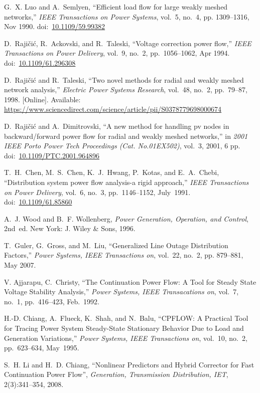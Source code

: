 \documentclass[12pt]{article}
\newcommand{\doi}[1]{doi:~\href{https://doi.org/#1}{#1}}
\numberwithin{equation}{section}
\numberwithin{table}{section}
\numberwithin{figure}{section}
\begin{document}
\begin{thebibliography}{99}
G.~X. Luo and A.~Semlyen, ``Efficient load flow for large weakly meshed
  networks,'' \emph{IEEE Transactions on Power Systems}, vol.~5, no.~4, pp.
  1309--1316, Nov 1990.
  \doi{10.1109/59.99382}

D.~Raji\v{c}i\'{c}, R.~Ackovski, and R.~Taleski, ``Voltage correction power flow,''
  \emph{IEEE Transactions on Power Delivery}, vol.~9, no.~2, pp.~1056--1062,
  Apr 1994.
  \doi{10.1109/61.296308}

D.~Raji\v{c}i\'{c} and R.~Taleski, ``Two novel methods for radial and weakly
  meshed network analysis,'' \emph{Electric Power Systems Research}, vol.~48,
  no.~2, pp.~79--87, 1998. [Online]. Available:
  \url{https://www.sciencedirect.com/science/article/pii/S0378779698000674}

D.~Raji\v{c}i\'{c} and A.~Dimitrovski, ``A new method for handling pv nodes in
backward/forward power flow for radial and weakly meshed networks,'' in
\emph{2001 IEEE Porto Power Tech Proceedings (Cat. No.01EX502)}, vol.~3,
2001, 6 pp.
\doi{10.1109/PTC.2001.964896}

T.~H.~Chen, M.~S.~Chen, K.~J.~Hwang, P.~Kotas, and E.~A.~Chebi, ``Distribution system power flow analysis-a rigid approach,'' \emph{IEEE Transactions on Power Delivery}, vol.~6, no.~3, pp.~1146--1152, July~1991.
\doi{10.1109/61.85860}

A.~J. Wood and B.~F. Wollenberg, \emph{Power Generation, Operation, and
  Control}, 2nd~ed. New York: J. Wiley \& Sons, 1996.

T.~Guler, G.~Gross, and M.~Liu, ``Generalized Line Outage Distribution
  Factors,'' \emph{Power Systems, IEEE Transactions on}, vol.~22, no.~2, pp.
  879--881, May 2007.

V. Ajjarapu, C.~Christy, ``The Continuation Power Flow: A Tool for Steady State Voltage Stability Analysis,'' \emph{Power Systems, IEEE Transacations on}, vol.~7, no.~1, pp.~416--423, Feb.~1992.

H.-D. Chiang, A.~Flueck, K.~Shah, and N.~Balu, ``CPFLOW:  A Practical Tool for Tracing Power System Steady-State Stationary Behavior Due to Load and Generation Variations,'' \emph{Power Systems, IEEE Transactions on}, vol.~10, no.~2, pp.~623--634, May~1995.

S.~H. Li and H.~D. Chiang, ``Nonlinear Predictors and Hybrid Corrector for Fast Continuation Power Flow'', {\em Generation, Transmission Distribution, IET}, 2(3):341--354, 2008.


\end{thebibliography}
\end{document}
